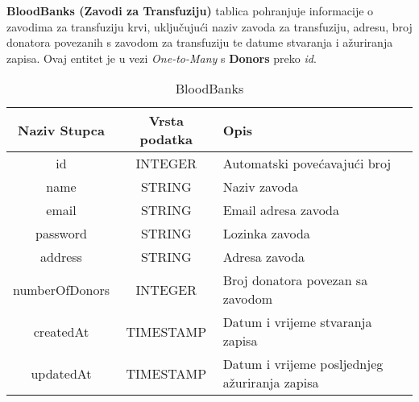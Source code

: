 				\noindent\textbf{BloodBanks (Zavodi za Transfuziju)} tablica pohranjuje informacije o zavodima za transfuziju krvi, uključujući naziv zavoda za transfuziju, adresu, broj donatora povezanih s zavodom za transfuziju te datume stvaranja i ažuriranja zapisa. Ovaj entitet je u vezi \textit{One-to-Many} s \textbf{Donors} preko \textit{id}.
				\begin{table}[H]
				    \renewcommand{\arraystretch}{2}
				    \centering
				     \begin{tabularx}{1\textwidth}{|c|c|X|}
				    \hline
				    \textbf{Naziv Stupca} & \textbf{Vrsta podatka} & \textbf{Opis} \\
				    \hline
				    \cellcolor{LightGreen} id & INTEGER & Automatski povećavajući broj\\
				    \hline
				    name & STRING & Naziv zavoda \\
				    \hline
				    email & STRING & Email adresa zavoda \\
				    \hline
				    password & STRING & Lozinka zavoda \\
				    \hline
				    address & STRING & Adresa zavoda \\
				    \hline
				    numberOfDonors & INTEGER & Broj donatora povezan sa zavodom \\
				    \hline
				    createdAt & TIMESTAMP & Datum i vrijeme stvaranja zapisa \\
				    \hline
				    updatedAt & TIMESTAMP & Datum i vrijeme posljednjeg ažuriranja zapisa \\
				    \hline
				    \end{tabularx}
				    \caption{BloodBanks}
				    \label{tab:my_label}
				\end{table}
				\clearpage %
				
